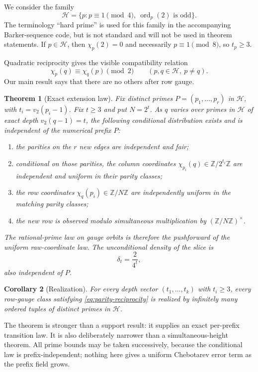 \documentclass[11pt]{article}
\newtheorem{theorem}{Theorem}[section]
\newtheorem{corollary}[theorem]{Corollary}
\theoremstyle{definition}
\theoremstyle{remark}
\newcommand{\Z}{\mathbb Z}
\newcommand{\ord}{\operatorname{ord}}
\newcommand{\vtwo}{v_2}
\begin{document}
We consider the family
\[
  \mathcal H=\{p:p\equiv1\pmod4,\ \ord_p(2)\text{ is odd}\}.
\]
The terminology ``hard prime'' is used for this family in the accompanying
Barker-sequence code, but is not standard and will not be used in theorem
statements.  If $p\in\mathcal H$, then $\chi_p(2)=0$ and necessarily
$p\equiv1\pmod8$, so $t_p\ge3$.

Quadratic reciprocity gives the visible compatibility relation
\begin{equation}\label{eq:parity-reciprocity}
  \chi_p(q)\equiv\chi_q(p)\pmod2
  \qquad(p,q\in\mathcal H,\ p\ne q).
\end{equation}
Our main result says that there are no others after row gauge.

\begin{theorem}[Exact extension law]\label{thm:extension}
Fix distinct primes $P=(p_1,\ldots,p_r)$ in $\mathcal H$, with
$t_i=\vtwo(p_i-1)$.  Fix $t\ge3$ and put $N=2^t$.  As $q$ varies over
primes in $\mathcal H$ of exact depth $\vtwo(q-1)=t$, the following
conditional distribution exists and is independent of the numerical
prefix $P$:
\begin{enumerate}[label=(\roman*)]
  \item the parities on the $r$ new edges are independent and fair;
  \item conditional on those parities, the column coordinates
  $\chi_{p_i}(q)\in\Z/2^{t_i}\Z$ are independent and uniform in their
  parity classes;
  \item the row coordinates $\chi_q(p_i)\in\Z/N\Z$ are independently
  uniform in the matching parity classes;
  \item the new row is observed modulo simultaneous multiplication by
  $(\Z/N\Z)^\times$.
\end{enumerate}
The rational-prime law on gauge orbits is therefore the pushforward of the
uniform raw-coordinate law.  The unconditional density of the slice is
\[
  \delta_t=\frac{2}{4^t},
\]
also independent of $P$.
\end{theorem}

\begin{corollary}[Realization]\label{cor:realization}
For every depth vector $(t_1,\ldots,t_k)$ with $t_i\ge3$, every
row-gauge class satisfying \eqref{eq:parity-reciprocity} is realized by
infinitely many ordered tuples of distinct primes in $\mathcal H$.
\end{corollary}

The theorem is stronger than a support result: it supplies an exact
per-prefix transition law.  It is also deliberately narrower than a
simultaneous-height theorem.  All prime bounds may be taken successively,
because the conditional law is prefix-independent; nothing here gives a
uniform Chebotarev error term as the prefix field grows.
\end{document}
